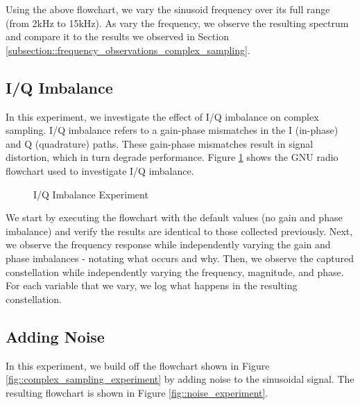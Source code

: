 \documentclass{article}
\begin{document}
Using the above flowchart, we vary the sinusoid frequency over its full range (from 2kHz to 15kHz). As vary the frequency, we observe the resulting spectrum and compare it to the results we observed in Section \ref{subsection::frequency_observations_complex_sampling}.

\subsection{I/Q Imbalance}

In this experiment, we investigate the effect of I/Q imbalance on complex sampling. I/Q imbalance refers to a gain-phase mismatches in the I (in-phase) and Q (quadrature) paths. These gain-phase mismatches result in signal distortion, which in turn degrade performance. Figure \ref{fig::iq_imbalance_experiment} shows the GNU radio flowchart used to investigate I/Q imbalance.

\begin{figure}[H]
	\centerline{}
	\caption{I/Q Imbalance Experiment}
	\label{fig::iq_imbalance_experiment}
\end{figure}

We start by executing the flowchart with the default values (no gain and phase imbalance) and verify the results are identical to those collected previously. Next, we observe the frequency response while independently varying the gain and phase imbalances - notating what occurs and why. Then, we observe the captured constellation while independently varying the frequency, magnitude, and phase. For each variable that we vary, we log what happens in the resulting constellation.  

\subsection{Adding Noise}

In this experiment, we build off the flowchart shown in Figure \ref{fig::complex_sampling_experiment} by adding noise to the sinusoidal signal. The resulting flowchart is shown in Figure \ref{fig::noise_experiment}.
\end{document}
